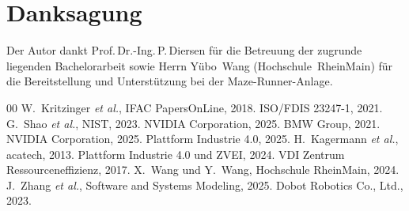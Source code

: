 \documentclass[conference]{IEEEtran}
\begin{document}
\section*{Danksagung}
Der Autor dankt Prof.\,Dr.-Ing.\,P.\,Diersen für die Betreuung der zugrunde liegenden Bachelorarbeit sowie Herrn Yübo~Wang (Hochschule~RheinMain) für die Bereitstellung und Unterstützung bei der Maze-Runner-Anlage.

\begin{thebibliography}{00}
 W.~Kritzinger \emph{et al.}, IFAC PapersOnLine, 2018.
 ISO/FDIS 23247-1, 2021.
 G.~Shao \emph{et al.}, NIST, 2023.
 NVIDIA Corporation, 2025.
 BMW Group, 2021.
 NVIDIA Corporation, 2025.
 Plattform Industrie 4.0, 2025.
 H.~Kagermann \emph{et al.}, acatech, 2013.
 Plattform Industrie 4.0 und ZVEI, 2024.
 VDI Zentrum Ressourceneffizienz, 2017.
 X.~Wang und Y.~Wang, Hochschule RheinMain, 2024.
 J.~Zhang \emph{et al.}, Software and Systems Modeling, 2025.
 Dobot Robotics Co., Ltd., 2023.
\end{thebibliography}
\end{document}
